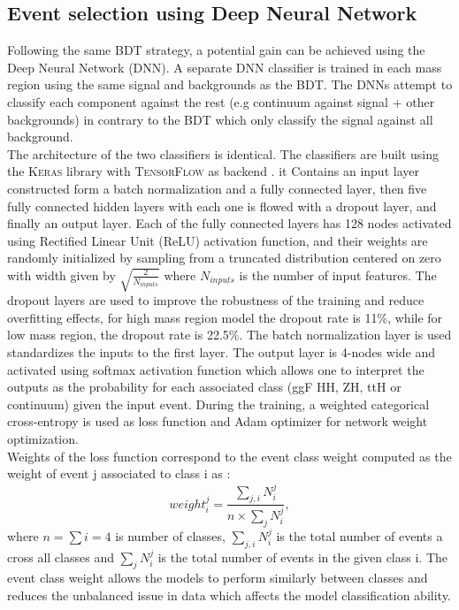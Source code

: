 \subsection{Event selection using Deep Neural Network}
\label{HHyybb:ObjEvt:DNN}

Following the same BDT strategy, a potential gain can be achieved using the Deep Neural Network (DNN). A separate DNN classifier is trained in each mass region using the same signal and backgrounds as the BDT. The DNNs attempt to classify each component against the rest (e.g continuum against signal + other backgrounds) in contrary to the BDT which only classify the signal against all background. \\
The architecture of the two classifiers is identical. The classifiers are built using the \textsc{Keras} library with \textsc{TensorFlow} as backend \cite{keras,tensorflow}. it Contains an input layer constructed form a batch normalization and a fully connected layer, then five fully connected hidden layers with each one is flowed with a dropout layer, and finally an output layer. Each of the fully connected layers has 128 nodes activated using Rectified Linear Unit (ReLU) activation function, and their weights are randomly initialized by sampling from a truncated distribution centered on zero with width given by $\sqrt{\frac{2}{N_{inputs}}}$ where $N_{inputs}$ is the number of input features. The dropout layers are used to improve the robustness of the training and reduce overfitting effects, for high mass region model the dropout rate is 11\%, while for low mass region, the dropout rate is 22.5\%. The batch normalization layer is used standardizes the inputs to the first layer. The output layer is 4-nodes wide and activated using softmax activation function which allows one to interpret the outputs as the probability for each associated class (ggF HH, ZH, ttH or continuum) given the input event. During the training, a weighted categorical cross-entropy is used as loss function and Adam optimizer for network weight optimization.\\
Weights of the loss function correspond to the event class weight computed as the weight of event j associated to class i as :
\begin{equation}
    weight_i^j = \frac{\sum_{j,i} N_i^j}{n\times\sum_{j} N_i^j},
\end{equation}
where $n=\sum i = 4$ is number of classes, $\sum_{j,i} N_i^j$ is the total number of events a cross all classes and $\sum_{j} N_i^j$ is the total number of events in the given class i. The event class weight allows the models to perform similarly between classes and reduces the unbalanced issue in data which affects the model classification ability.\\
